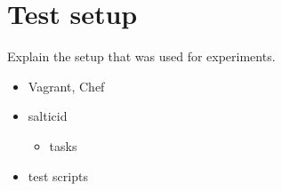 \section{Test setup}

Explain the setup that was used for experiments.

\begin{itemize}
  \item Vagrant, Chef
  \item salticid
  \begin{itemize}
    \item tasks
  \end{itemize}
  \item test scripts
\end{itemize}
